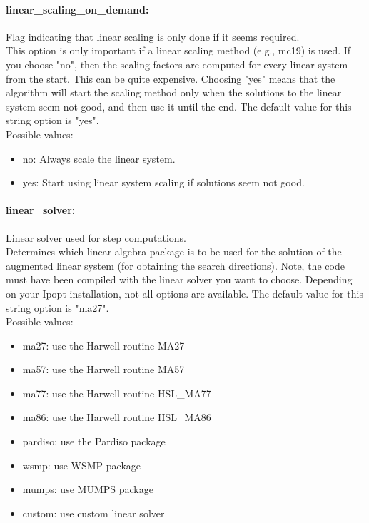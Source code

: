\paragraph{linear\_scaling\_on\_demand:}\label{sec:linear_scaling_on_demand} Flag indicating that linear scaling is only done if it seems required. $\;$ \\
 This option is only important if a linear scaling
method (e.g., mc19) is used.  If you choose "no",
then the scaling factors are computed for every
linear system from the start.  This can be quite
expensive. Choosing "yes" means that the
algorithm will start the scaling method only when
the solutions to the linear system seem not good,
and then use it until the end.
The default value for this string option is "yes".
\\ 
Possible values:
\begin{itemize}
   \item no: Always scale the linear system.
   \item yes: Start using linear system scaling if solutions
seem not good.
\end{itemize}

\paragraph{linear\_solver:}\label{sec:linear_solver} Linear solver used for step computations. $\;$ \\
 Determines which linear algebra package is to be
used for the solution of the augmented linear
system (for obtaining the search directions).
Note, the code must have been compiled with the
linear solver you want to choose. Depending on
your Ipopt installation, not all options are
available.
The default value for this string option is "ma27".
\\ 
Possible values:
\begin{itemize}
   \item ma27: use the Harwell routine MA27
   \item ma57: use the Harwell routine MA57
   \item ma77: use the Harwell routine HSL\_MA77
   \item ma86: use the Harwell routine HSL\_MA86
   \item pardiso: use the Pardiso package
   \item wsmp: use WSMP package
   \item mumps: use MUMPS package
   \item custom: use custom linear solver
\end{itemize}

